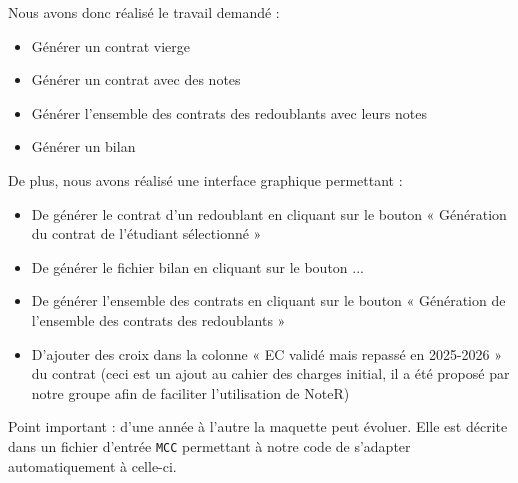 Nous avons donc réalisé le travail demandé :
\begin{itemize}
    \item Générer un contrat vierge
    \item Générer un contrat avec des notes
    \item Générer l'ensemble des contrats des redoublants avec leurs notes
    \item Générer un bilan
\end{itemize}


\noindent De plus, nous avons réalisé une interface graphique permettant : 
\begin{itemize}
  \item De générer le contrat d'un redoublant en cliquant sur le bouton « Génération du contrat de l'étudiant sélectionné »
  \item De générer le fichier bilan en cliquant sur le bouton ...
  \item De générer l'ensemble des contrats en cliquant sur le bouton « Génération de l'ensemble des contrats des redoublants »
  \item D'ajouter des croix dans la colonne « EC validé mais repassé en 2025-2026 » du contrat (ceci est un ajout au cahier des charges initial, il a été proposé par notre groupe afin de faciliter l'utilisation de NoteR)
\end{itemize}

Point important : d'une année à l'autre la maquette peut évoluer. Elle est décrite dans un fichier d'entrée \texttt{MCC} permettant à notre code de s'adapter automatiquement à celle-ci.